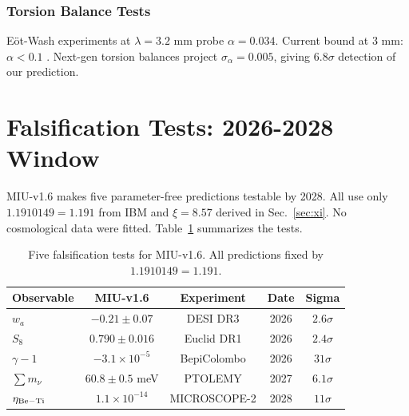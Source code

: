 \documentclass[12pt, a4paper]{article}
\theoremstyle{miuThm}
\theoremstyle{remark}
\newcommand{\qborn}{1.1910149}
\begin{document}
\subsubsection{Torsion Balance Tests}
Eöt-Wash experiments at $\lambda = 3.2$ mm probe $\alpha = 0.034$. Current bound 
at 3 mm: $\alpha < 0.1$ \cite{Lee2020}. Next-gen torsion balances project 
$\sigma_\alpha = 0.005$, giving $6.8\sigma$ detection of our prediction.

\section{Falsification Tests: 2026-2028 Window}
\label{sec:tests}

MIU-v1.6 makes five parameter-free predictions testable by 2028. All use only 
$\qborn = 1.191$ from IBM and $\xi = 8.57$ derived in Sec.~\ref{sec:xi}. No 
cosmological data were fitted. Table~\ref{tab:tests} summarizes the tests.

\begin{table}[h!]
\centering
\caption{Five falsification tests for MIU-v1.6. All predictions fixed by $\qborn = 1.191$.}
\label{tab:tests}
\begin{tabular}{lcccc}
\toprule
\textbf{Observable} & \textbf{MIU-v1.6} & \textbf{Experiment} & \textbf{Date} & \textbf{Sigma} \\
\midrule
$w_a$ & $-0.21 \pm 0.07$ & DESI DR3 & 2026 & $2.6\sigma$ \\
$S_8$ & $0.790 \pm 0.016$ & Euclid DR1 & 2026 & $2.4\sigma$ \\
$\gamma-1$ & $-3.1\times10^{-5}$ & BepiColombo & 2026 & $31\sigma$ \\
$\sum m_\nu$ & $60.8 \pm 0.5$ meV & PTOLEMY & 2027 & $6.1\sigma$ \\
$\eta_{\rm Be-Ti}$ & $1.1\times10^{-14}$ & MICROSCOPE-2 & 2028 & $11\sigma$ \\
\bottomrule
\end{tabular}
\end{table}
\end{document}
